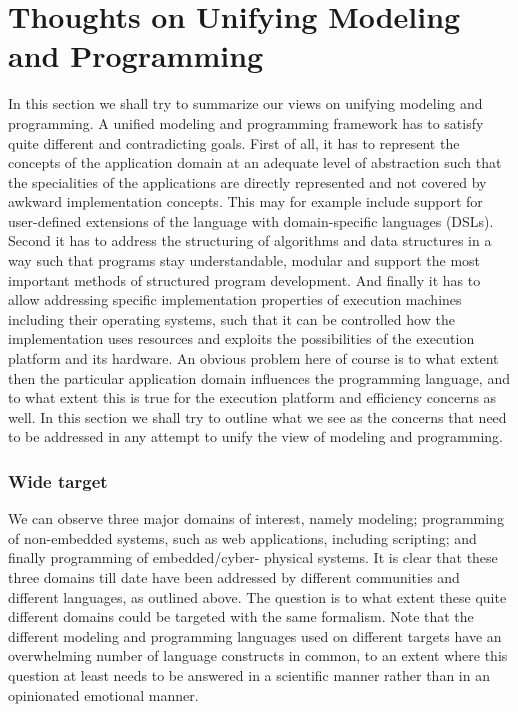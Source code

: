 

\section{Thoughts on Unifying Modeling and Programming}
\label{sec:concerns}

In this section we shall try to summarize our views on 
unifying modeling and programming.
A unified modeling and programming framework has to satisfy 
quite different and contradicting goals.
First of all, it has to represent the concepts of the 
application domain at an adequate level of 
abstraction such that the specialities of the applications 
are directly represented and not covered by awkward implementation 
concepts. This may for example include support for user-defined 
extensions of the language with domain-specific languages (DSLs). 
Second it has to address the structuring of algorithms and data 
structures in a way such that programs stay understandable, 
modular and support the most important methods of structured 
program development. And finally it has to allow addressing 
specific implementation properties of execution machines including 
their operating systems, such that it can be controlled how the 
implementation uses resources and exploits the possibilities of 
the execution platform and its hardware. An obvious problem here 
of course is to what extent then the particular application domain 
influences the programming language, and to what extent this 
is true for the execution platform and efficiency concerns as
well. In this section we shall try to outline what we see as the 
concerns that need to be addressed in any attempt to unify the 
view of modeling and 
programming.

\subsubsection{Wide target}

We can observe three major domains of interest, namely modeling; 
programming of non-embedded systems, such as web applications, 
including scripting; and finally programming of embedded/cyber-
physical systems. It is clear that these three domains till date 
have been addressed by different communities and different 
languages, as outlined above. The question is to what extent these
quite different domains could be targeted with the same formalism.
Note that the different modeling and programming languages used on
different targets have an overwhelming number of language constructs in
common, to an extent where this question at least needs to be answered
in a scientific manner rather than in an opinionated emotional manner.


